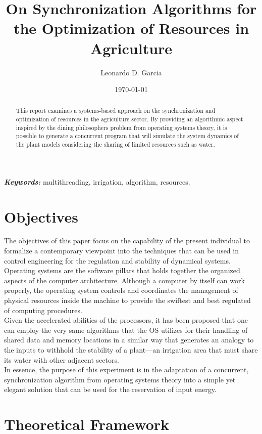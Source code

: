 \documentclass[12pt]{article}
\title{On Synchronization Algorithms for the Optimization of Resources in Agriculture}
\author{Leonardo D. Garcia}
\date{\today}
\begin{document}
\maketitle

\begin{abstract}
This report examines a systems-based approach on the synchronization and optimization of resources in the agriculture sector. By providing an algorithmic aspect inspired by the dining philosophers problem from operating systems theory, it is possible to generate a concurrent program that will simulate the system dynamics of the plant models considering the sharing of limited resources such as water.
\end{abstract}

\small
\textbf{\textit{Keywords:}} multithreading, irrigation, algorithm, resources.

\section{Objectives}
The objectives of this paper focus on the capability of the present individual to formalize a contemporary viewpoint into the techniques that can be used in control engineering for the regulation and stability of dynamical systems. \\

Operating systems are the software pillars that holds together the organized aspects of the computer architecture. Although a computer by itself can work properly, the operating system controls and coordinates the management of physical resources inside the machine to provide the swiftest and best regulated of computing procedures. \\

Given the accelerated abilities of the processors, it has been proposed that one can employ the very same algorithms that the OS utilizes for their handling of shared data and memory locations in a similar way that generates an analogy to the inputs to withhold the stability of a plant—an irrigation area that must share its water with other adjacent sectors. \\

In essence, the purpose of this experiment is in the adaptation of a concurrent, synchronization algorithm from operating systems theory into a simple yet elegant solution that can be used for the reservation of input energy. \\

\section{Theoretical Framework}
\end{document}
